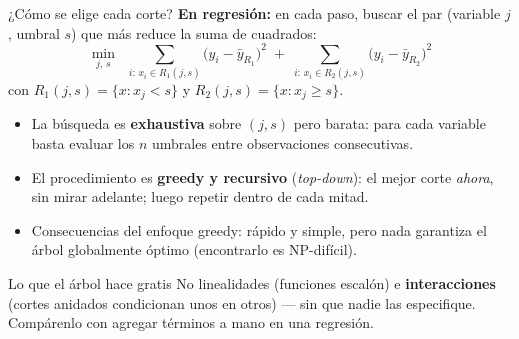 \documentclass{beamer}
\newcommand{\1}{\mathbb{I}}
\begin{document}
\begin{frame}{¿Cómo se elige cada corte?}
\small
\textbf{En regresión:} en cada paso, buscar el par (variable $j$, umbral $s$) que más reduce la suma de cuadrados:
\[ \min_{j,\,s} \;\; \sum_{i:\, x_i \in R_1(j,s)} \big( y_i - \bar{y}_{R_1} \big)^2 \;+\; \sum_{i:\, x_i \in R_2(j,s)} \big( y_i - \bar{y}_{R_2} \big)^2 \]
con $R_1(j,s) = \{x : x_j < s\}$ y $R_2(j,s) = \{x : x_j \geq s\}$.
\pause

\vspace{0.2cm}
\begin{itemize}\itemsep5pt
  \item La búsqueda es \textbf{exhaustiva} sobre $(j, s)$ pero barata: para cada variable basta evaluar los $n$ umbrales entre observaciones consecutivas.
  \item El procedimiento es \textbf{greedy y recursivo} (\emph{top-down}): el mejor corte \emph{ahora}, sin mirar adelante; luego repetir dentro de cada mitad. \pause
  \item Consecuencias del enfoque greedy: rápido y simple, pero nada garantiza el árbol globalmente óptimo (encontrarlo es NP-difícil).
\end{itemize}
\pause

\begin{block}{Lo que el árbol hace gratis}
No linealidades (funciones escalón) e \textbf{interacciones} (cortes anidados condicionan unos en otros) --- sin que nadie las especifique. Compárenlo con agregar términos a mano en una regresión.
\end{block}
\end{frame}
\end{document}

